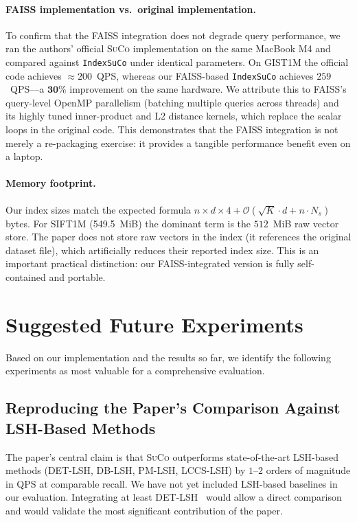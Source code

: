 \documentclass[11pt,a4paper]{article}
\newcommand{\suco}{\textsc{SuCo}}
\newcommand{\NS}{N_s}
\begin{document}
\paragraph{FAISS implementation vs.\ original implementation.}
To confirm that the FAISS integration does not degrade query performance, we
ran the authors' official \suco{} implementation on the same MacBook M4 and
compared against \texttt{IndexSuCo} under identical parameters.  On GIST1M
the official code achieves $\approx 200$~QPS, whereas our FAISS-based
\texttt{IndexSuCo} achieves $259$~QPS---a $\mathbf{30\%}$ improvement on the
same hardware.  We attribute this to FAISS's query-level OpenMP parallelism
(batching multiple queries across threads) and its highly tuned inner-product
and L2 distance kernels, which replace the scalar loops in the original code.
This demonstrates that the FAISS integration is not merely a re-packaging
exercise: it provides a tangible performance benefit even on a laptop.

\paragraph{Memory footprint.}
Our index sizes match the expected formula
$n \times d \times 4 + \mathcal{O}(\sqrt{K} \cdot d + n \cdot \NS)$
bytes.  For SIFT1M (549.5~MiB) the dominant term is the $512$~MiB raw vector
store.  The paper does not store raw vectors in the index (it references the
original dataset file), which artificially reduces their reported index size.
This is an important practical distinction: our FAISS-integrated version is
fully self-contained and portable.

\section{Suggested Future Experiments}

Based on our implementation and the results so far, we identify the following
experiments as most valuable for a comprehensive evaluation.

\subsection{Reproducing the Paper's Comparison Against LSH-Based Methods}

The paper's central claim is that \suco{} outperforms state-of-the-art
LSH-based methods (DET-LSH, DB-LSH, PM-LSH, LCCS-LSH) by $1$--$2$ orders of
magnitude in QPS at comparable recall.  We have not yet included LSH-based
baselines in our evaluation.  Integrating at least DET-LSH~\cite{wei2024detlsh}
would allow a direct comparison and would validate the most significant
contribution of the paper.
\end{document}
